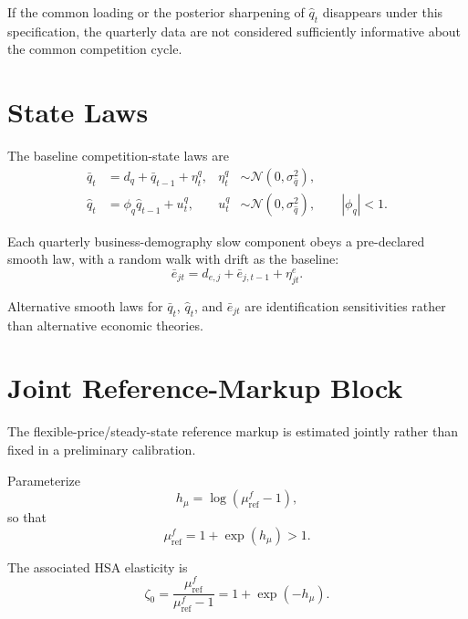 \documentclass[11pt]{article}
\newcommand{\Normal}{\mathcal{N}}
\begin{document}
If the common loading or the posterior sharpening of \(\hat q_t\) disappears under this specification, the quarterly data are not considered sufficiently informative about the common competition cycle.

\section{State Laws}

The baseline competition-state laws are
\begin{align}
\bar q_t
&=
d_q+\bar q_{t-1}+\eta_t^q,
&
\eta_t^q
&\sim\Normal(0,\sigma_{\bar q}^2),
\\
\hat q_t
&=
\phi_q\hat q_{t-1}+u_t^q,
&u_t^q
&\sim\Normal(0,\sigma_{\hat q}^2),
\qquad |\phi_q|<1.
\end{align}

Each quarterly business-demography slow component obeys a pre-declared smooth law, with a random walk with drift as the baseline:
\begin{equation}
\bar e_{jt}
=
d_{e,j}+\bar e_{j,t-1}+\eta_{jt}^{e}.
\end{equation}

Alternative smooth laws for \(\bar q_t\), \(\hat q_t\), and \(\bar e_{jt}\) are identification sensitivities rather than alternative economic theories.

\section{Joint Reference-Markup Block}

The flexible-price/steady-state reference markup is estimated jointly rather than fixed in a preliminary calibration.

Parameterize
\begin{equation}
h_\mu
=
\log(\mu_{\mathrm{ref}}^f-1),
\end{equation}
so that
\begin{equation}
\mu_{\mathrm{ref}}^f
=
1+\exp(h_\mu)>1.
\end{equation}

The associated HSA elasticity is
\begin{equation}
\boxed{
\zeta_0
=
\frac{\mu_{\mathrm{ref}}^f}
{\mu_{\mathrm{ref}}^f-1}
=
1+\exp(-h_\mu).
}
\label{eq:zeta_reference}
\end{equation}
\end{document}
